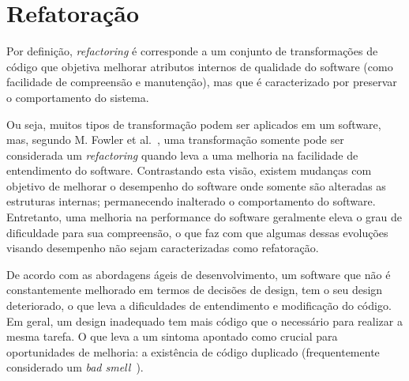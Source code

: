 \section{Refatoração}\label{sec:refactoring}

Por definição, \textit{refactoring} é corresponde a 
um conjunto de transformações  
de código que objetiva melhorar atributos internos de qualidade  
do software (como facilidade de compreensão e 
manutenção), mas que é caracterizado por preservar o comportamento do 
sistema. 

Ou seja, muitos tipos de transformação 
podem ser aplicados em um software, mas, segundo M. Fowler et al.~\cite{martinFowlerRafactoring}, 
uma transformação somente pode ser considerada um \textit{refactoring} quando 
leva a uma melhoria na facilidade de entendimento do software. 
Contrastando esta visão, existem mudanças com objetivo de melhorar o desempenho do 
software onde somente são alteradas as estruturas internas; permanecendo inalterado o comportamento do software. 
Entretanto, uma melhoria na performance do software geralmente eleva o grau de dificuldade para sua 
compreensão, o que faz com que algumas dessas evoluções visando desempenho não sejam 
caracterizadas como refatoração.


De acordo com as abordagens ágeis de 
desenvolvimento, um software que não é constantemente melhorado em 
termos de decisões de design, tem o seu design deteriorado, 
o que leva a dificuldades de entendimento e modificação do código. 
Em geral, um design inadequado tem mais código 
que o necessário para realizar a mesma tarefa. O que leva a um sintoma apontado 
como crucial para oportunidades de melhoria: 
a existência de código duplicado (frequentemente considerado um 
\emph{bad smell}~\cite{Tufano:2015:WYC:2818754.2818805,martinFowlerRafactoring}). 

